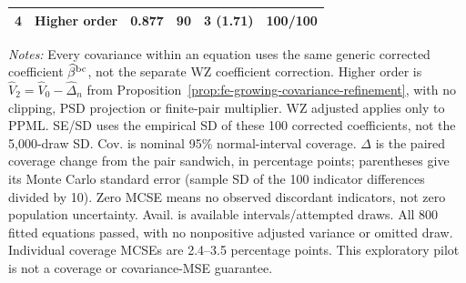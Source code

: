 \begin{table}[p]
\begin{singlespace}
\begin{tabular}{@{}llrrrr@{}}
4 & Higher order & 0.877 & 90 & 3 (1.71) & 100/100 \\
\bottomrule
\end{tabular}
\par\smallskip
\begin{minipage}{\linewidth}
\footnotesize\textit{Notes:} Every covariance within an equation uses the same generic corrected coefficient $\widehat\beta^{\rm bc}$, not the separate WZ coefficient correction. Higher order is $\widehat V_2=\widehat V_0-\widehat\Delta_n$ from Proposition~\ref{prop:fe-growing-covariance-refinement}, with no clipping, PSD projection or finite-pair multiplier. WZ adjusted applies only to PPML. SE/SD uses the empirical SD of these 100 corrected coefficients, not the 5,000-draw SD. Cov. is nominal 95\% normal-interval coverage. $\Delta$ is the paired coverage change from the pair sandwich, in percentage points; parentheses give its Monte Carlo standard error (sample SD of the 100 indicator differences divided by 10). Zero MCSE means no observed discordant indicators, not zero population uncertainty. Avail. is available intervals/attempted draws. All 800 fitted equations passed, with no nonpositive adjusted variance or omitted draw. Individual coverage MCSEs are 2.4--3.5 percentage points. This exploratory pilot is not a coverage or covariance-MSE guarantee.
\end{minipage}
\end{singlespace}
\end{table}

